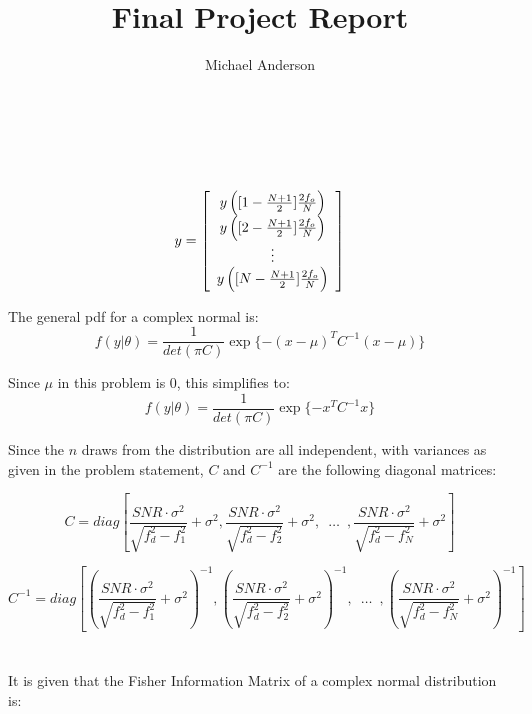 \documentclass{article}
\author{Michael Anderson}
\title{Final Project Report}
\begin{document}
\setlength{\parskip}{1em}
\maketitle
{}
\\
\flushleft
\newpage
\thispagestyle{empty}
\mbox{}
\pagebreak

\section{}
\[
y = \left[ \begin{array}{c c}
y \left([1-\frac{N+1}{2}]\frac{2f_o}{N}\right) \\
y \left([2-\frac{N+1}{2}]\frac{2f_o}{N}\right) \\
\vdots \\
y \left([N-\frac{N+1}{2}]\frac{2f_o}{N}\right) \\
\end{array} \right]
\]

The general pdf for a complex normal is:
\[
f(y|\theta) = \frac{1}{det(\pi C)} \exp \{ -(x-\mu)^TC^{-1}(x-\mu) \}
\]

Since $\mu$ in this problem is 0, this simplifies to:
\[
f(y|\theta) = \frac{1}{det(\pi C)} \exp \{ -x^TC^{-1}x \}
\]

Since the $n$ draws from the distribution are all independent, with variances
as given in the problem statement, $C$ and $C^{-1}$ are
the following diagonal matrices:

\[
C = diag \left[\frac{SNR \cdot \sigma^2}{\sqrt{f^2_d - f^2_1}} + \sigma^2, 
\frac{SNR \cdot \sigma^2}{\sqrt{f^2_d - f^2_2}} + \sigma^2, \hspace{6pt} \ldots \hspace{6pt},
\frac{SNR \cdot \sigma^2}{\sqrt{f^2_d - f^2_N}} + \sigma^2
\right]
\]

\[
C^{-1} = diag \left[ \left( \frac{SNR \cdot \sigma^2}{\sqrt{f^2_d - f^2_1}} + \sigma^2 \right) ^{-1}, 
\left( \frac{SNR \cdot \sigma^2}{\sqrt{f^2_d - f^2_2}} + \sigma^2 \right)^{-1}, \hspace{6pt} \ldots \hspace{6pt},
\left( \frac{SNR \cdot \sigma^2}{\sqrt{f^2_d - f^2_N}} + \sigma^2 \right)^{-1}
\right]
\]

\section{}
It is given that the Fisher Information Matrix of a complex normal distribution is:
\end{document}
